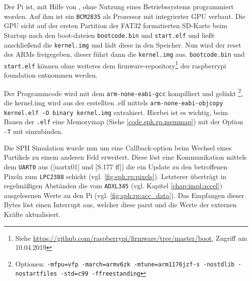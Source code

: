 Der Pi ist, mit Hilfe von \cite{rp1.headless.github}, ohne Nutzung eines Betriebssystems programmiert worden. Auf ihm ist ein \texttt{BCM2835} als Prozessor mit integrierter GPU verbaut. Die GPU sicht auf der ersten Partition der FAT32 formatierten SD-Karte beim Startup nach den boot-dateien \texttt{bootcode.bin} und \texttt{start.elf} und ließt anschließend die \texttt{kernel.img} und lädt diese in den Speicher. Nun wird der reset des ARMs freigegeben, dieser führt dann die \texttt{kernel.img} aus. \texttt{bootcode.bin} und \texttt{start.elf} können ohne weiteres dem firmware-repository\footnote{Siehe \url{https://github.com/raspberrypi/firmware/tree/master/boot}, Zugriff am 10.04.2019} der raspberrypi foundation entnommen werden.

Der Programmcode wird mit dem \texttt{arm-none-eabi-gcc} kompilliert und gelinkt \footnote{Optionen: \texttt{-mfpu=vfp -march=armv6zk -mtune=arm1176jzf-s -nostdlib -nostartfiles -std=c99 -ffreestanding}}, die kernel.img wird aus der erstellten .elf mittels \texttt{arm-none-eabi-objcopy kernel.elf -O binary kernel.img} extrahiert. Hierbei ist es wichtig, beim Bauen der \texttt{.elf} eine Memorymap (Siehe \ref{code.sph.rp.memmap}) mit der Option \texttt{-T} mit einzubinden.

Die SPH Simulation wurde nun um eine Callback-option beim Wechsel eines Partikels zu einem anderen Feld erweitert. Diese löst eine Kommunikation mittels dem \texttt{UART0} aus (\cite{rp1.headless.github}[uartx01] und \cite{broadcom.bcm2835.user_manual}[S.177 ff]) die ein Update zu den betroffenen Pixeln zum \texttt{LPC2388} schickt (vgl. \ref{fig:sph:rp:pixels}). Letzterer überträgt in regelmäßigen Abständen die vom \texttt{ADXL345} (vgl. Kapitel \ref{chap:impl:accel}) ausgelesenen Werte an den Pi (vgl. \ref{fig:sph:rp:acc_data}). Das Empfangen dieser Bytes löst einen Interrupt aus, welcher diese parst und die Werte der externen Kräfte aktualisiert.